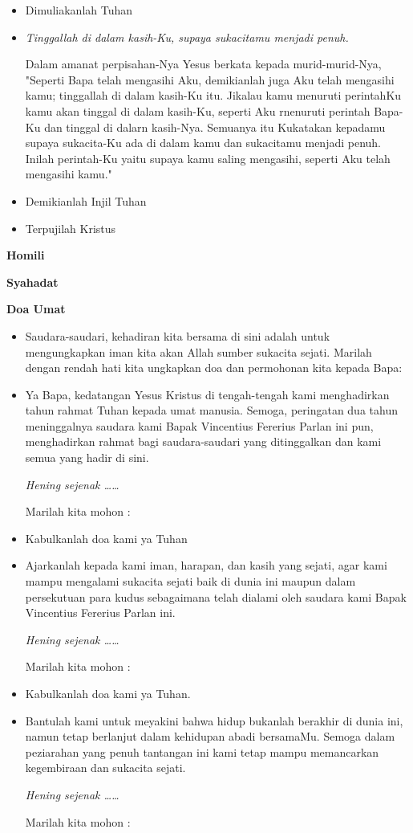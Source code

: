 \documentclass[titlepage,10pt,openany]{scrbook}
\makeatletter
\newcommand{\subjudul}[1]{%
  {\parindent \z@ 
    \interlinepenalty\@M \bfseries #1\par\nobreak \vskip 10\p@ }}
\newcommand{\BU}[1]{\begin{itemize} \item[U:] #1 \end{itemize}}
\newcommand{\BI}[1]{\begin{itemize} \item[I:] #1 \end{itemize}}
\newcommand{\BP}[1]{\begin{itemize} \item[P:] #1 \end{itemize}}
\newcommand{\namaalm}{Bapak Vincentius Fererius Parlan }
\makeatother
\begin{document}
\BU{Dimuliakanlah Tuhan}

\BI{\textit{Tinggallah di dalam kasih-Ku, supaya sukacitamu menjadi penuh.}
	
	Dalam amanat perpisahan-Nya Yesus berkata kepada murid-murid-Nya,
	"Seperti Bapa telah mengasihi Aku, demikianlah juga Aku telah
	mengasihi kamu; tinggallah di dalam kasih-Ku itu. Jikalau kamu
	menuruti perintahKu kamu akan tinggal di dalam kasih-Ku, seperti Aku
	rnenuruti perintah Bapa-Ku dan tinggal di dalarn kasih-Nya.
	Semuanya itu Kukatakan kepadamu supaya sukacita-Ku ada di dalam
	kamu dan sukacitamu menjadi penuh. Inilah perintah-Ku yaitu supaya
	kamu saling mengasihi, seperti Aku telah mengasihi kamu."
}


\BI{Demikianlah Injil Tuhan}

\BU{Terpujilah Kristus}

 

\subjudul{Homili}

\subjudul{Syahadat} 

\subjudul{Doa Umat}

\BI{Saudara-saudari, kehadiran kita bersama di sini adalah untuk mengungkapkan iman kita akan Allah sumber sukacita sejati. Marilah dengan rendah hati kita ungkapkan doa dan permohonan kita kepada Bapa:}
\BP{Ya Bapa, kedatangan Yesus Kristus di tengah-tengah kami menghadirkan tahun rahmat Tuhan kepada umat manusia. Semoga, peringatan dua tahun meninggalnya saudara kami \namaalm ini pun, menghadirkan rahmat bagi saudara-saudari yang ditinggalkan dan kami semua yang hadir di sini.

\textit{Hening sejenak \ldots\ldots} 

Marilah kita mohon :}

\BU{Kabulkanlah doa kami ya Tuhan}


\BP{Ajarkanlah kepada kami iman, harapan, dan kasih yang sejati, agar kami mampu mengalami sukacita sejati baik di dunia ini maupun dalam persekutuan para kudus sebagaimana telah dialami oleh saudara kami \namaalm ini. 

\textit{Hening sejenak \ldots\ldots} 

Marilah kita mohon :}

\BU{Kabulkanlah doa kami ya Tuhan.}

\BP{Bantulah kami untuk meyakini bahwa hidup bukanlah berakhir di dunia ini, namun tetap berlanjut dalam kehidupan abadi bersamaMu. Semoga dalam peziarahan yang penuh tantangan ini kami tetap mampu memancarkan kegembiraan dan sukacita sejati. 

\textit{Hening sejenak \ldots\ldots} 

Marilah kita mohon :}
\end{document}
